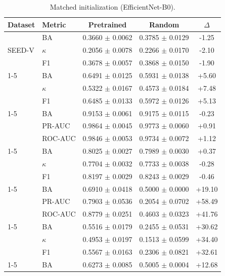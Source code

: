 \begin{table}[tbp]\centering\scriptsize\caption{Matched initialization (EfficientNet-B0).}\label{tab:app-init-effnet}\begin{tabular}{@{}l l c c c@{}}\toprule Dataset & Metric & Pretrained & Random & $\Delta$ \\ \midrule
\multirow{3}{*}{SEED-V} & BA & 0.3660 $\pm$ 0.0062 & 0.3785 $\pm$ 0.0129 & -1.25 \\
 & $\kappa$ & 0.2056 $\pm$ 0.0078 & 0.2266 $\pm$ 0.0170 & -2.10 \\
 & F1 & 0.3678 $\pm$ 0.0057 & 0.3868 $\pm$ 0.0150 & -1.90 \\
\cmidrule(lr){1-5}
\multirow{3}{*}{PhysioNet-MI} & BA & 0.6491 $\pm$ 0.0125 & 0.5931 $\pm$ 0.0138 & +5.60 \\
 & $\kappa$ & 0.5322 $\pm$ 0.0167 & 0.4573 $\pm$ 0.0184 & +7.48 \\
 & F1 & 0.6485 $\pm$ 0.0133 & 0.5972 $\pm$ 0.0126 & +5.13 \\
\cmidrule(lr){1-5}
\multirow{3}{*}{Mumtaz2016} & BA & 0.9153 $\pm$ 0.0061 & 0.9175 $\pm$ 0.0115 & -0.23 \\
 & PR-AUC & 0.9864 $\pm$ 0.0045 & 0.9773 $\pm$ 0.0060 & +0.91 \\
 & ROC-AUC & 0.9846 $\pm$ 0.0053 & 0.9734 $\pm$ 0.0072 & +1.12 \\
\cmidrule(lr){1-5}
\multirow{3}{*}{ISRUC} & BA & 0.8025 $\pm$ 0.0027 & 0.7989 $\pm$ 0.0030 & +0.37 \\
 & $\kappa$ & 0.7704 $\pm$ 0.0032 & 0.7733 $\pm$ 0.0038 & -0.28 \\
 & F1 & 0.8197 $\pm$ 0.0029 & 0.8243 $\pm$ 0.0029 & -0.46 \\
\cmidrule(lr){1-5}
\multirow{3}{*}{MentalArithmetic} & BA & 0.6910 $\pm$ 0.0418 & 0.5000 $\pm$ 0.0000 & +19.10 \\
 & PR-AUC & 0.7903 $\pm$ 0.0536 & 0.2054 $\pm$ 0.0702 & +58.49 \\
 & ROC-AUC & 0.8779 $\pm$ 0.0251 & 0.4603 $\pm$ 0.0323 & +41.76 \\
\cmidrule(lr){1-5}
\multirow{3}{*}{FACED} & BA & 0.5516 $\pm$ 0.0179 & 0.2455 $\pm$ 0.0531 & +30.62 \\
 & $\kappa$ & 0.4953 $\pm$ 0.0197 & 0.1513 $\pm$ 0.0599 & +34.40 \\
 & F1 & 0.5567 $\pm$ 0.0163 & 0.2306 $\pm$ 0.0821 & +32.61 \\
\cmidrule(lr){1-5}
\multirow{3}{*}{SHU-MI} & BA & 0.6273 $\pm$ 0.0085 & 0.5005 $\pm$ 0.0004 & +12.68 \\

\end{tabular}
\end{table}
